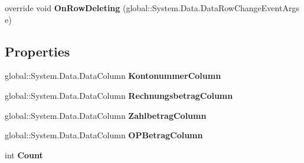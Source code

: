 \begin{DoxyCompactItemize}
\item 
override void {\bfseries On\+Row\+Deleting} (global\+::\+System.\+Data.\+Data\+Row\+Change\+Event\+Args e)\hypertarget{class_products_1_1_data_1_1ds_sage_1_1_unpaid_item_data_table_acf3763934bb887067d77af68581c9e87}{}\label{class_products_1_1_data_1_1ds_sage_1_1_unpaid_item_data_table_acf3763934bb887067d77af68581c9e87}

\end{DoxyCompactItemize}
\subsection*{Properties}
\begin{DoxyCompactItemize}
\item 
global\+::\+System.\+Data.\+Data\+Column {\bfseries Kontonummer\+Column}\hypertarget{class_products_1_1_data_1_1ds_sage_1_1_unpaid_item_data_table_ada30ad849c793b1ad035df56c341f3f8}{}\label{class_products_1_1_data_1_1ds_sage_1_1_unpaid_item_data_table_ada30ad849c793b1ad035df56c341f3f8}

\item 
global\+::\+System.\+Data.\+Data\+Column {\bfseries Rechnungsbetrag\+Column}\hypertarget{class_products_1_1_data_1_1ds_sage_1_1_unpaid_item_data_table_aad6ab9189a54b090ffa94e9b2fcdc0fa}{}\label{class_products_1_1_data_1_1ds_sage_1_1_unpaid_item_data_table_aad6ab9189a54b090ffa94e9b2fcdc0fa}

\item 
global\+::\+System.\+Data.\+Data\+Column {\bfseries Zahlbetrag\+Column}\hypertarget{class_products_1_1_data_1_1ds_sage_1_1_unpaid_item_data_table_ab326aab25ed912dd2c03dbd12e49d348}{}\label{class_products_1_1_data_1_1ds_sage_1_1_unpaid_item_data_table_ab326aab25ed912dd2c03dbd12e49d348}

\item 
global\+::\+System.\+Data.\+Data\+Column {\bfseries O\+P\+Betrag\+Column}\hypertarget{class_products_1_1_data_1_1ds_sage_1_1_unpaid_item_data_table_a04ffbd761206f42768f0cd0219703699}{}\label{class_products_1_1_data_1_1ds_sage_1_1_unpaid_item_data_table_a04ffbd761206f42768f0cd0219703699}

\item 
int {\bfseries Count}\hypertarget{class_products_1_1_data_1_1ds_sage_1_1_unpaid_item_data_table_a27c5405bebcc565f93093169f9fa0195}{}\label{class_products_1_1_data_1_1ds_sage_1_1_unpaid_item_data_table_a27c5405bebcc565f93093169f9fa0195}


\end{DoxyCompactItemize}

